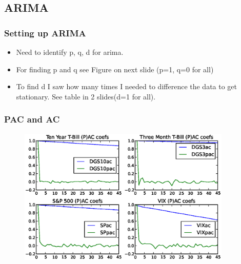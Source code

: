 \documentclass[11pt]{beamer}
\theoremstyle{definition}
\begin{document}
  \subsection{ARIMA}
  \begin{frame}\frametitle{Setting up ARIMA}

  \begin{itemize}[<+->]
    \item Need to identify p, q, d for arima.
    \item For finding p and q see Figure on next slide (p=1, q=0 for all)
    \item To find d I saw how many times I needed to difference the data to get stationary. See table in 2 slides(d=1 for all).
  \end{itemize}

  \end{frame}

  \begin{frame}\frametitle{PAC and AC}

    \begin{figure}[!h]
          \centering
          \includegraphics[width=4in]{../Figures/all_corrs.eps}
          \label{fig:correlations}
      \end{figure}

  \end{frame}
\end{document}
